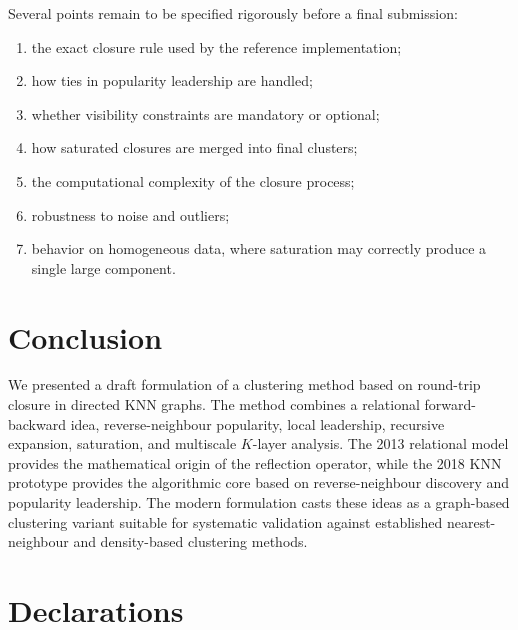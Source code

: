 \documentclass[pdflatex,sn-mathphys-num]{sn-jnl}
\begin{document}
Several points remain to be specified rigorously before a final submission:
\begin{enumerate}
    \item the exact closure rule used by the reference implementation;
    \item how ties in popularity leadership are handled;
    \item whether visibility constraints are mandatory or optional;
    \item how saturated closures are merged into final clusters;
    \item the computational complexity of the closure process;
    \item robustness to noise and outliers;
    \item behavior on homogeneous data, where saturation may correctly produce a single large component.
\end{enumerate}

\section{Conclusion}\label{sec:conclusion}

We presented a draft formulation of a clustering method based on round-trip closure in directed KNN graphs. The method combines a relational forward-backward idea, reverse-neighbour popularity, local leadership, recursive expansion, saturation, and multiscale $K$-layer analysis. The 2013 relational model provides the mathematical origin of the reflection operator, while the 2018 KNN prototype provides the algorithmic core based on reverse-neighbour discovery and popularity leadership. The modern formulation casts these ideas as a graph-based clustering variant suitable for systematic validation against established nearest-neighbour and density-based clustering methods.

\backmatter



\section*{Declarations}
\end{document}
